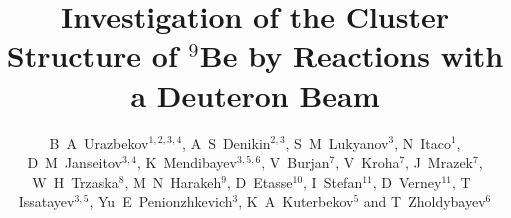 \documentclass[10pt]{iopart}
\begin{document}
\title[B A Urazbekov \etal ]{Investigation of the Cluster Structure of $^9$Be by Reactions with a Deuteron Beam}

\author{B~A~Urazbekov$^{1,2,3,4}$, A~S~Denikin$^{2,3}$, S~M~Lukyanov$^3$,  N~Itaco$^1$,  D~M~Janseitov$^{3,4}$, K~Mendibayev$^{3,5,6}$, V~Burjan$^7$, V~Kroha$^7$, J~Mrazek$^7$, W~H~Trzaska$^8$, M~N~Harakeh$^9$, D~Etasse$^{10}$, I~Stefan$^{11}$, D~Verney$^{11}$, T~ Issatayev$^{3,5}$, Yu~E~Penionzhkevich$^{3}$, K~A~Kuterbekov$^{5}$ and T~Zholdybayev$^{6}$}

\address{$^1$ Dipartimento di Matematica e Fisica,
Universit\`{a} degli Studi della Campania “Luigi Vanvitelli”, I-8110 Caserta, Italy}
\address{$^2$ Dubna State University, 141982 Dubna, Russia}
\address{$^3$ Joint Institute for nuclear research,  141980 Dubna, Russia}
\address{$^4$ Al-Farabi Kazakh National University, 050040 Almaty, Kazakhstan }
\address{$^5$ L~N~Gumilyov Eurasian National University, 010008 Astana, Kazakhstan }
\address{$^6$ Institute of Nuclear Physics, 050032 Almaty, Kazakhstan}
\address{$^7$ Nuclear Physics Institute CAS, 25068 \v{R}e\v{z}, Czech Republic}
\address{$^8$ Department of Physics, University of Jyv\"askyl\"a, FIN-40014 Jyv\"askyl\"a, Finland}
\address{$^9$ KVI-CART, University of Groningen, 9747 AA Groningen, The Netherlands}
\address{$^{10}$ Normandie Universit\'{e}, ENSICAEN, UNICAEN, CNRS/IN2P3, LPC Caen, 14000 Caen, France}
\address{$^{11}$ Institut de Physique Nucl\'{e}aire, Univ. Paris-Sud, Universit\'{e} Paris-Saclay, F-91406 Orsay, France}
\end{document}

